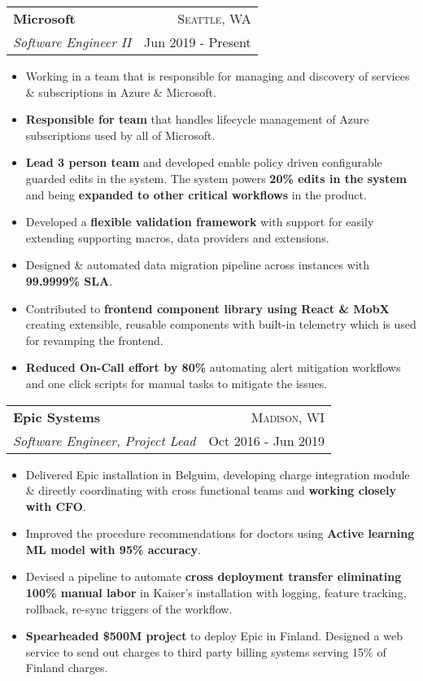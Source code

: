 \documentclass[letterpaper,11pt]{article}
\makeatletter
\newcommand{\resumeItem}[1]{
  \item\small{
    {#1 \vspace{-1pt}}
  }
}
\newcommand{\resumeSubheading}[4]{
  \vspace{-1pt}\item
    \begin{tabular*}{\textwidth}[t]{l@{\extracolsep{\fill}}r}
      \textbf{#1} & {\color{dark-grey}\textsc{#2}}\vspace{1pt}\\ %
      \textit{#3} & {\color{dark-grey} {#4}}\\ %
    \end{tabular*}\vspace{-4pt}
}
\newcommand{\resumeItemListStart}{\begin{itemize}}
\newcommand{\resumeItemListEnd}{\end{itemize}\vspace{0pt}}
\makeatother
\begin{document}
    \resumeSubheading
      {Microsoft}{Seattle, WA}
      {Software Engineer II}{Jun 2019 - Present}
      \resumeItemListStart
        \resumeItem
          {Working in a team that is responsible for managing and discovery of services \& subscriptions in Azure \& Microsoft.}
        \resumeItem
          {\textbf{Responsible for team} that handles lifecycle management of Azure subscriptions used by all of Microsoft.}
        \resumeItem
          {\textbf{Lead 3 person team} and developed enable policy driven configurable guarded edits in the system. The system powers \textbf{20\% edits in the system} and being \textbf{expanded to other critical workflows} in the product.}
        \resumeItem
          {Developed a \textbf{flexible validation framework} with support for easily extending supporting macros, data providers and extensions.}
        \resumeItem
          {Designed \& automated data migration pipeline across instances with \textbf{99.9999\% SLA}.}
        \resumeItem
          {Contributed to \textbf{frontend component library using React \& MobX} creating extensible, reusable components with built-in telemetry which is used for revamping the frontend.}
        \resumeItem
          {\textbf{Reduced On-Call effort by 80\%} automating alert mitigation workflows and one click scripts for manual tasks to mitigate the issues.}
        \resumeItemListEnd

    \resumeSubheading
      {Epic Systems}{Madison, WI}
      {Software Engineer, Project Lead}{Oct 2016 - Jun 2019}
      \resumeItemListStart
        \resumeItem
          {Delivered Epic installation in Belguim, developing charge integration module \& directly coordinating with cross functional teams and \textbf{working closely with CFO}.}
        \resumeItem
          {Improved the procedure recommendations for doctors using \textbf{Active learning ML model with 95\% accuracy}.}
        \resumeItem
          {Devised a pipeline to automate \textbf{cross deployment transfer eliminating 100\% manual labor} in Kaiser’s installation with logging, feature tracking, rollback, re-sync triggers of the workflow.}
        \resumeItem
          {\textbf{Spearheaded \$500M project} to deploy Epic in Finland. Designed a web service to send out charges to third party billing systems serving 15\% of Finland charges.}
      \resumeItemListEnd
\end{document}
